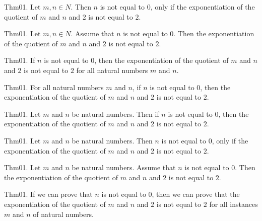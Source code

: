 \documentclass{article}
\begin{document}
Thm01. Let $m , n \in N$. Then $n$ is not equal to $0$, only if the exponentiation of the quotient of $m$ and $n$ and $2$ is not equal to $2$.

Thm01. Let $m , n \in N$. Assume that $n$ is not equal to $0$. Then the exponentiation of the quotient of $m$ and $n$ and $2$ is not equal to $2$.

Thm01. If $n$ is not equal to $0$, then the exponentiation of the quotient of $m$ and $n$ and $2$ is not equal to $2$ for all natural numbers $m$ and $n$.

Thm01. For all natural numbers $m$ and $n$, if $n$ is not equal to $0$, then the exponentiation of the quotient of $m$ and $n$ and $2$ is not equal to $2$.

Thm01. Let $m$ and $n$ be natural numbers. Then if $n$ is not equal to $0$, then the exponentiation of the quotient of $m$ and $n$ and $2$ is not equal to $2$.

Thm01. Let $m$ and $n$ be natural numbers. Then $n$ is not equal to $0$, only if the exponentiation of the quotient of $m$ and $n$ and $2$ is not equal to $2$.

Thm01. Let $m$ and $n$ be natural numbers. Assume that $n$ is not equal to $0$. Then the exponentiation of the quotient of $m$ and $n$ and $2$ is not equal to $2$.

Thm01. If we can prove that $n$ is not equal to $0$, then we can prove that the exponentiation of the quotient of $m$ and $n$ and $2$ is not equal to $2$ for all instances $m$ and $n$ of natural numbers.
\end{document}
